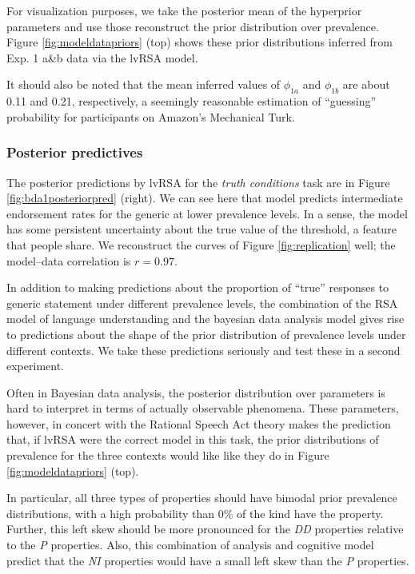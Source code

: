 \documentclass[10pt,letterpaper]{article}
\begin{document}
For visualization purposes, we take the posterior mean of the hyperprior parameters and use those reconstruct the prior distribution over prevalence. Figure \ref{fig:modeldatapriors} (top) shows these prior distributions inferred from Exp. 1 a\&b data via the lvRSA model. 

It should also be noted that the mean inferred values of  $\phi_{1a}$ and $\phi_{1b}$ are about 0.11 and 0.21, respectively, a seemingly reasonable estimation of ``guessing'' probability for participants on Amazon's Mechanical Turk.

\subsubsection{Posterior predictives}
The posterior predictions by lvRSA for the \emph{truth conditions} task are in Figure \ref{fig:bda1posteriorpred} (right). We can see here that model predicts intermediate endorsement rates for the generic at lower prevalence levels. In a sense, the model has some persistent uncertainty about the true value of the threshold, a feature that people share. We reconstruct the curves of Figure \ref{fig:replication} well; the model--data correlation is $r = 0.97$.




In addition to making predictions about the proportion of ``true'' responses to generic statement under different prevalence levels, the combination of the RSA model of language understanding and the bayesian data analysis model gives rise to predictions about the shape of the prior distribution of prevalence levels under different contexts. We take these predictions seriously and test these in a second experiment. 

Often in Bayesian data analysis, the posterior distribution over parameters is hard to interpret in terms of actually observable phenomena. These parameters, however, in concert with the Rational Speech Act theory makes the prediction that, if lvRSA were the correct model in this task, the prior distributions of prevalence for the three contexts would like like they do in Figure \ref{fig:modeldatapriors} (top). 

In particular, all three types of properties should have bimodal prior prevalence distributions, with a high probability than 0\% of the kind have the property. Further, this left skew should be more pronounced for the \emph{DD} properties relative to the \emph{P} properties. Also, this combination of analysis and cognitive model predict that the \emph{NI} properties would have a small left skew than the \emph{P} properties.
\end{document}
